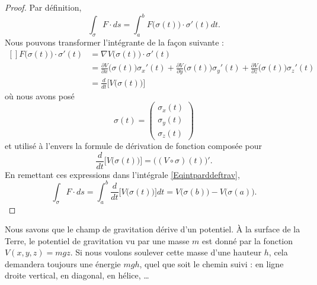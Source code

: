 \begin{proof}
	Par définition,
	\begin{equation}        \label{Eqintparddeftrav}
		\int_{\sigma} F\cdot ds=\int_a^b F\big( \sigma(t) \big)\cdot \sigma'(t)dt.
	\end{equation}
	Nous pouvons transformer l'intégrante de la façon suivante :
	\begin{equation}
		\begin{aligned}[]
			F\big( \sigma(t) \big)\cdot\sigma'(t) & =\nabla V\big( \sigma(t) \big)\cdot\sigma'(t)                                                                                                                                                               \\
			                                      & =\frac{ \partial V }{ \partial x }\big( \sigma(t) \big)\sigma_x'(t) +\frac{ \partial V }{ \partial y }\big( \sigma(t) \big)\sigma_y'(t) +\frac{ \partial V }{ \partial z }\big( \sigma(t) \big)\sigma_z'(t) \\
			                                      & =\frac{ d }{ dt }\Big[ V\big( \sigma(t) \big) \Big]
		\end{aligned}
	\end{equation}
	où nous avons posé
	\begin{equation}
		\sigma(t)=\begin{pmatrix}
			\sigma_x(t) \\
			\sigma_y(t) \\
			\sigma_z(t)
		\end{pmatrix}
	\end{equation}
	et utilisé à l'envers la formule de dérivation de fonction composée pour
	\begin{equation}
		\frac{ d }{ dt }\Big[ V\big( \sigma(t) \big) \Big]=\Big( (V\circ\sigma)(t) \Big)'.
	\end{equation}
	En remettant ces expressions dans l'intégrale \eqref{Eqintparddeftrav},
	\begin{equation}
		\int_{\sigma}F\cdot ds=\int_a^b\frac{ d }{ dt }\Big[ V\big( \sigma(t) \big) \Big]dt=V\big( \sigma(b) \big)-V\big( \sigma(a) \big).
	\end{equation}
\end{proof}

\begin{example}
	Nous savons que le champ de gravitation dérive d'un potentiel. À la surface de la Terre, le potentiel de gravitation vu par une masse \( m\) est donné par la fonction \( V(x,y,z)=mgz\). Si nous voulons soulever cette masse d'une hauteur \( h\), cela demandera toujours une énergie \( mgh\), quel que soit le chemin suivi : en ligne droite vertical, en diagonal, en hélice, \ldots
\end{example}

